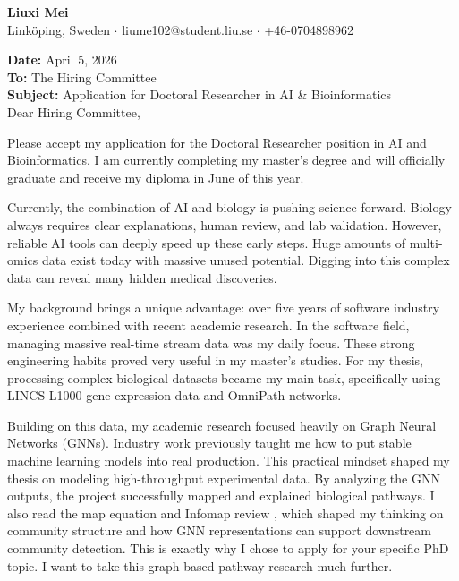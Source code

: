\documentclass[11pt,a4paper]{article}
\begin{document}
\begin{center}
    {\LARGE \textbf{Liuxi Mei}} \\
    \vspace{2mm}
    Linköping, Sweden $\cdot$ liume102@student.liu.se $\cdot$ +46-0704898962
    \vspace{4mm}
\end{center}

\textbf{Date:} April 5, 2026 \\
\textbf{To:} The Hiring Committee \\
\textbf{Subject:} Application for Doctoral Researcher in AI \& Bioinformatics \\

Dear Hiring Committee,

Please accept my application for the Doctoral Researcher position in AI and Bioinformatics. I am currently completing my master's degree and will officially graduate and receive my diploma in June of this year.

Currently, the combination of AI and biology is pushing science forward. Biology always requires clear explanations, human review, and lab validation. However, reliable AI tools can deeply speed up these early steps. Huge amounts of multi-omics data exist today with massive unused potential. Digging into this complex data can reveal many hidden medical discoveries.

My background brings a unique advantage: over five years of software industry experience combined with recent academic research. In the software field, managing massive real-time stream data was my daily focus. These strong engineering habits proved very useful in my master's studies. For my thesis, processing complex biological datasets became my main task, specifically using LINCS L1000 gene expression data and OmniPath networks.

Building on this data, my academic research focused heavily on Graph Neural Networks (GNNs). Industry work previously taught me how to put stable machine learning models into real production. This practical mindset shaped my thesis on modeling high-throughput experimental data. By analyzing the GNN outputs, the project successfully mapped and explained biological pathways. I also read the map equation and Infomap review \cite{smiljanic2025mapequation}, which shaped my thinking on community structure and how GNN representations can support downstream community detection. This is exactly why I chose to apply for your specific PhD topic. I want to take this graph-based pathway research much further. 
\end{document}

